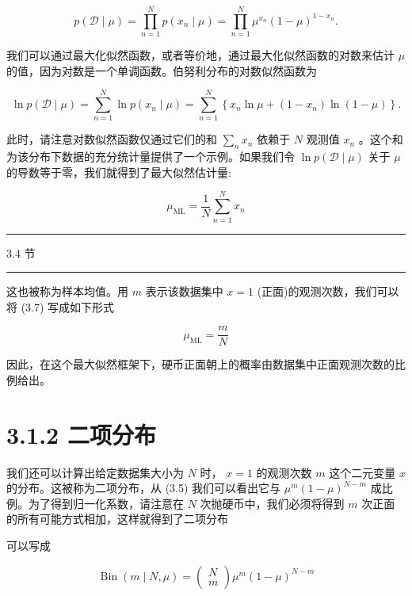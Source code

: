 \documentclass[10pt]{report}
\newcommand{\HRule}{\begin{center}\rule{0.9\linewidth}{0.2mm}\end{center}}
\begin{document}
\[
p\left( {\mathcal{D} \mid  \mu }\right)  = \mathop{\prod }\limits_{{n = 1}}^{N}p\left( {{x}_{n} \mid  \mu }\right)  = \mathop{\prod }\limits_{{n = 1}}^{N}{\mu }^{{x}_{n}}{\left( 1 - \mu \right) }^{1 - {x}_{n}}. \tag{3.5}
\]

我们可以通过最大化似然函数，或者等价地，通过最大化似然函数的对数来估计 \(\mu\) 的值，因为对数是一个单调函数。伯努利分布的对数似然函数为

\[
\ln p\left( {\mathcal{D} \mid  \mu }\right)  = \mathop{\sum }\limits_{{n = 1}}^{N}\ln p\left( {{x}_{n} \mid  \mu }\right)  = \mathop{\sum }\limits_{{n = 1}}^{N}\left\{  {{x}_{n}\ln \mu  + \left( {1 - {x}_{n}}\right) \ln \left( {1 - \mu }\right) }\right\}  . \tag{3.6}
\]

此时，请注意对数似然函数仅通过它们的和 \(\mathop{\sum }\limits_{n}{x}_{n}\) 依赖于 \(N\) 观测值 \({x}_{n}\) 。这个和为该分布下数据的充分统计量提供了一个示例。如果我们令 \(\ln p\left( {\mathcal{D} \mid  \mu }\right)\) 关于 \(\mu\) 的导数等于零，我们就得到了最大似然估计量:

\[
{\mu }_{\mathrm{{ML}}} = \frac{1}{N}\mathop{\sum }\limits_{{n = 1}}^{N}{x}_{n} \tag{3.7}
\]

\HRule

3.4 节

\HRule

这也被称为样本均值。用 \(m\) 表示该数据集中 \(x = 1\) (正面)的观测次数，我们可以将 (3.7) 写成如下形式

\[
{\mu }_{\mathrm{{ML}}} = \frac{m}{N} \tag{3.8}
\]

因此，在这个最大似然框架下，硬币正面朝上的概率由数据集中正面观测次数的比例给出。

\section*{3.1.2 二项分布}

我们还可以计算出给定数据集大小为 \(N\) 时， \(x = 1\) 的观测次数 \(m\) 这个二元变量 \(x\) 的分布。这被称为二项分布，从 (3.5) 我们可以看出它与 \({\mu }^{m}{\left( 1 - \mu \right) }^{N - m}\) 成比例。为了得到归一化系数，请注意在 \(N\) 次抛硬币中，我们必须将得到 \(m\) 次正面的所有可能方式相加，这样就得到了二项分布

可以写成

\[
\operatorname{Bin}\left( {m \mid  N,\mu }\right)  = \left( \begin{array}{l} N \\  m \end{array}\right) {\mu }^{m}{\left( 1 - \mu \right) }^{N - m} \tag{3.9}
\]
\end{document}
